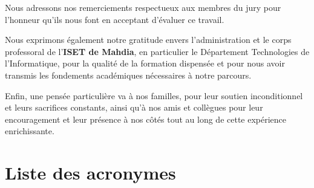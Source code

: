\documentclass[a4paper,12pt,twoside]{report}
\begin{document}
\noindent
Nous adressons nos remerciements respectueux aux membres du jury pour l'honneur qu'ils nous font en acceptant d'évaluer ce travail.

\noindent
Nous exprimons également notre gratitude envers l'administration et le corps professoral de l'\textbf{ISET de Mahdia}, en particulier le Département Technologies de l'Informatique, pour la qualité de la formation dispensée et pour nous avoir transmis les fondements académiques nécessaires à notre parcours.

\noindent
Enfin, une pensée particulière va à nos familles, pour leur soutien inconditionnel et leurs sacrifices constants, ainsi qu'à nos amis et collègues pour leur encouragement et leur présence à nos côtés tout au long de cette expérience enrichissante.

\clearpage
\thispagestyle{preStyle}
\tableofcontents

\clearpage
\thispagestyle{preStyle}
\listoffigures

\clearpage
\thispagestyle{preStyle}
\listoftables
\chapter*{Liste des acronymes}
\begin{acronym}
  
\end{acronym}
\clearpage
\pagestyle{mainStyle}
\setcounter{page}{1}









\clearpage
{}


\end{document}
